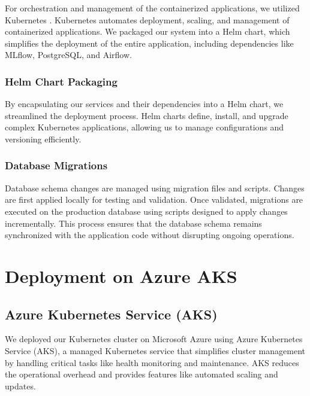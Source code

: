 For orchestration and management of the containerized applications, we utilized Kubernetes \cite{HightowerEtAl2017}. Kubernetes automates deployment, scaling, and management of containerized applications. We packaged our system into a Helm chart, which simplifies the deployment of the entire application, including dependencies like MLflow, PostgreSQL, and Airflow.

\subsubsection{Helm Chart Packaging}

By encapsulating our services and their dependencies into a Helm chart, we streamlined the deployment process. Helm charts define, install, and upgrade complex Kubernetes applications, allowing us to manage configurations and versioning efficiently.

\subsubsection{Database Migrations}

Database schema changes are managed using migration files and scripts. Changes are first applied locally for testing and validation. Once validated, migrations are executed on the production database using scripts designed to apply changes incrementally. This process ensures that the database schema remains synchronized with the application code without disrupting ongoing operations.

\section{Deployment on Azure AKS}

\subsection{Azure Kubernetes Service (AKS)}

We deployed our Kubernetes cluster on Microsoft Azure using Azure Kubernetes Service (AKS), a managed Kubernetes service that simplifies cluster management by handling critical tasks like health monitoring and maintenance. AKS reduces the operational overhead and provides features like automated scaling and updates.

